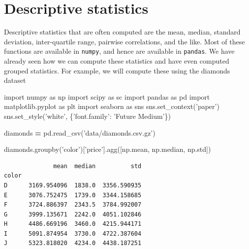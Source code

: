 \documentclass[
  letterpaper,
]{scrbook}
\newenvironment{Shaded}{\begin{snugshade}}{\end{snugshade}}
\newcommand{\ImportTok}[1]{#1}
\newcommand{\NormalTok}[1]{#1}
\newcommand{\OperatorTok}[1]{\textcolor[rgb]{0.81,0.36,0.00}{\textbf{#1}}}
\newcommand{\StringTok}[1]{\textcolor[rgb]{0.31,0.60,0.02}{#1}}
\begin{document}
\hypertarget{descriptive-statistics}{%
\section{Descriptive statistics}\label{descriptive-statistics}}

Descriptive statistics that are often computed are the mean, median, standard deviation, inter-quartile range, pairwise correlations, and the like. Most of these functions are available in \texttt{numpy}, and hence are available in \texttt{pandas}. We have already seen how we can compute these statistics and have even computed grouped statistics. For example, we will compute these using the diamonds dataset

\begin{Shaded}
\begin{Highlighting}[]
\ImportTok{import}\NormalTok{ numpy }\ImportTok{as}\NormalTok{ np}
\ImportTok{import}\NormalTok{ scipy }\ImportTok{as}\NormalTok{ sc}
\ImportTok{import}\NormalTok{ pandas }\ImportTok{as}\NormalTok{ pd}
\ImportTok{import}\NormalTok{ matplotlib.pyplot }\ImportTok{as}\NormalTok{ plt}
\ImportTok{import}\NormalTok{ seaborn }\ImportTok{as}\NormalTok{ sns}
\NormalTok{sns.set_context(}\StringTok{'paper'}\NormalTok{)}
\NormalTok{sns.set_style(}\StringTok{'white'}\NormalTok{, \{}\StringTok{'font.family'}\NormalTok{: }\StringTok{'Future Medium'}\NormalTok{\})}
\end{Highlighting}
\end{Shaded}

\begin{Shaded}
\begin{Highlighting}[]
\NormalTok{diamonds }\OperatorTok{=}\NormalTok{ pd.read_csv(}\StringTok{'data/diamonds.csv.gz'}\NormalTok{)}
\end{Highlighting}
\end{Shaded}

\begin{Shaded}
\begin{Highlighting}[]
\NormalTok{diamonds.groupby(}\StringTok{'color'}\NormalTok{)[}\StringTok{'price'}\NormalTok{].agg([np.mean, np.median, np.std])}
\end{Highlighting}
\end{Shaded}

\begin{verbatim}
              mean  median          std
color                                  
D      3169.954096  1838.0  3356.590935
E      3076.752475  1739.0  3344.158685
F      3724.886397  2343.5  3784.992007
G      3999.135671  2242.0  4051.102846
H      4486.669196  3460.0  4215.944171
I      5091.874954  3730.0  4722.387604
J      5323.818020  4234.0  4438.187251
\end{verbatim}
\end{document}
